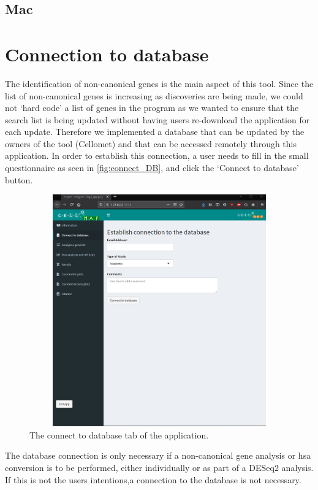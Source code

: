 \documentclass[11pt]{article}
\begin{document}
\subsection{Mac}

\section{Connection to database}
The identification of non-canonical genes is the main aspect of this tool. Since the list of non-canonical genes is increasing as discoveries are being made, we could not `hard code' a list of genes in the program as we wanted to ensure that the search list is being updated without having users re-download the application for each update. Therefore we implemented a database that can be updated by the owners of the tool (Cellomet) and that can be accessed remotely through this application.
In order to establish this connection, a user needs to fill in the small questionnaire as seen in \autoref{fig:connect_DB}, and click the `Connect to database' button.

\begin{figure}[h!]
\centering
\includegraphics[width=15cm,height=10cm,keepaspectratio]{connect_DB.png}
\caption{The connect to database tab of the application.}
\label{fig:connect_DB}
\end{figure}

The database connection is only necessary if a non-canonical gene analysis or \acrshort{hsa} conversion is to be performed, either individually or as part of a \acrshort{DESeq2} analysis. If this is not the users intentions,a connection to the database is not necessary.
\end{document}
